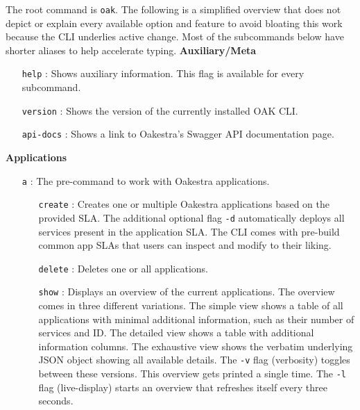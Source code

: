 The root command is \texttt{oak}.
The following is a simplified overview that does not depict or explain every available option and feature to avoid bloating this work because the CLI underlies active change.
Most of the subcommands below have shorter aliases to help accelerate typing.
\vspace{5mm}
\newline
\textbf{Auxiliary/Meta}
\begin{itemize}
    \item [\texttt{help}]:
        Shows auxiliary information.
        This flag is available for every subcommand.
    \item [\texttt{version}]:
        Shows the version of the currently installed OAK CLI.
    \item [\texttt{api-docs}]:
        Shows a link to Oakestra's Swagger API documentation page.
\end{itemize}
\vspace{5mm}
\textbf{Applications}
\begin{itemize}
    \item [\texttt{a}]:
        The pre-command to work with Oakestra applications.
        \begin{itemize}
            \item [\texttt{create}]:
                Creates one or multiple Oakestra applications based on the provided SLA.
                The additional optional flag \texttt{-d} automatically deploys all services present in the application SLA.
                The CLI comes with pre-build common app SLAs that users can inspect and modify to their liking.
            \item [\texttt{delete}]:
                Deletes one or all applications.
            \item [\texttt{show}]:
            Displays an overview of the current applications.
            The overview comes in three different variations.
            The simple view shows a table of all applications with minimal additional information, such as their number of services and ID.
            The detailed view shows a table with additional information columns.
            The exhaustive view shows the verbatim underlying JSON object showing all available details.
            The \texttt{-v} flag (verbosity) toggles between these versions.
            This overview gets printed a single time.
            The \texttt{-l} flag (live-display) starts an overview that refreshes itself every three seconds.
        \end{itemize}
\end{itemize}
